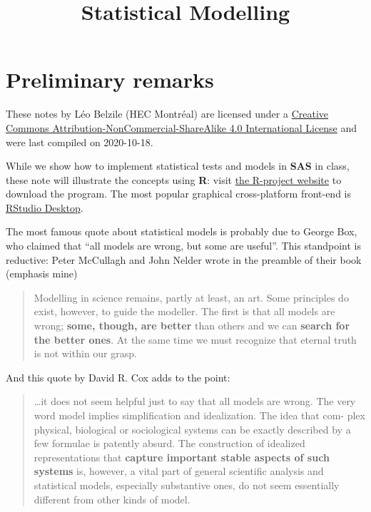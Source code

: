 \documentclass[
  11pt,
  letterpaper,
]{book}
\title{Statistical Modelling}
\author{}
\date{\vspace{-2.5em}}
\let\oldhref\href
\renewcommand{\href}[2]{#2\footnote{\url{#1}}}
\theoremstyle{definition}
\theoremstyle{definition}
\theoremstyle{definition}
\theoremstyle{remark}
\begin{document}
\maketitle

\let\href\oldhref

{
\setcounter{tocdepth}{1}
\tableofcontents
}
\hypertarget{preliminary-remarks}{%
\chapter*{Preliminary remarks}\label{preliminary-remarks}}

These notes by Léo Belzile (HEC Montréal) are licensed under a \href{http://creativecommons.org/licenses/by-nc-sa/4.0/}{Creative Commons Attribution-NonCommercial-ShareAlike 4.0 International License} and were last compiled on 2020-10-18.

While we show how to implement statistical tests and models in \textbf{SAS} in class, these note will illustrate the concepts using \textbf{R}: visit \href{https://cran.r-project.org/}{the R-project website} to download the program. The most popular graphical cross-platform front-end is \href{https://www.rstudio.com/products/rstudio/download/}{RStudio Desktop}.

The most famous quote about statistical models is probably due to George Box, who claimed that ``all models are wrong, but some are useful''. This standpoint is reductive: Peter McCullagh and John Nelder wrote in the preamble of their book (emphasis mine)

\begin{quote}
Modelling in science remains, partly at least, an art. Some principles do exist, however, to guide the modeller. The first is that all models are wrong; \textbf{some, though, are better} than others and we can \textbf{search for the better ones}. At the same time we must recognize that eternal truth is not within our grasp.
\end{quote}

And this quote by David R. Cox adds to the point:

\begin{quote}
\ldots it does not seem helpful just to say that all models are wrong. The very word model implies simplification and idealization. The idea that com-
plex physical, biological or sociological systems can be exactly described
by a few formulae is patently absurd. The construction of idealized representations that \textbf{capture important stable aspects of such systems}
is, however, a vital part of general scientific analysis and statistical models, especially substantive ones, do not seem essentially different from
other kinds of model.
\end{quote}
\end{document}
